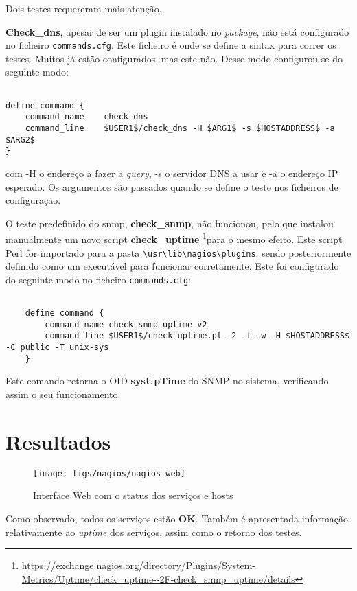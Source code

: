 Dois testes requereram mais atenção.

\textbf{Check\_dns}, apesar de ser um plugin instalado no \textit{package}, não está configurado no ficheiro \verb|commands.cfg|.
Este ficheiro é onde se define a sintax para correr os testes. Muitos já estão configurados, mas este não.
Desse modo configurou-se do seguinte modo:

\begin{lstlisting}

define command {
    command_name    check_dns
    command_line    $USER1$/check_dns -H $ARG1$ -s $HOSTADDRESS$ -a $ARG2$
}
\end{lstlisting}

com -H o endereço a fazer a \textit{query}, -s o servidor DNS a usar e -a o endereço IP esperado.
Os argumentos são passados quando se define o teste nos ficheiros de configuração.

\pagebreak

O teste predefinido do snmp, \textbf{check\_snmp}, não funcionou, pelo que instalou manualmente um novo script \textbf{check\_uptime} \footnote{\url{https://exchange.nagios.org/directory/Plugins/System-Metrics/Uptime/check_uptime--2F-check_snmp_uptime/details}}para o mesmo efeito.
Este script Perl for importado para a pasta \verb|\usr\lib\nagios\plugins|, sendo posteriormente definido como um executável para funcionar corretamente.
Este foi configurado do seguinte modo no ficheiro \verb|commands.cfg|:

\begin{lstlisting}

    define command {
        command_name check_snmp_uptime_v2
        command_line $USER1$/check_uptime.pl -2 -f -w -H $HOSTADDRESS$ -C public -T unix-sys
    }
\end{lstlisting}

Este comando retorna o OID \textbf{sysUpTime} do SNMP no sistema, verificando assim o seu funcionamento.

\section{Resultados}

\begin{figure}[H]
    \centering
    \texttt{[image: figs/nagios/nagios\_web]}
    \caption{Interface Web com o status dos serviços e hosts}
    \label{fig:nagios_web}
\end{figure}

Como observado, todos os serviços estão \textbf{OK}.
Também é apresentada informação relativamente ao \textit{uptime} dos serviços, assim como o retorno dos testes.

